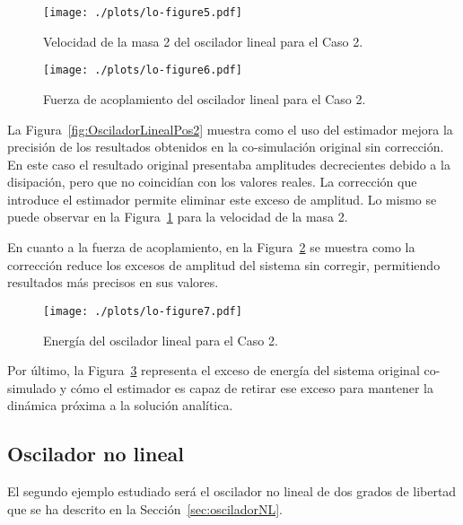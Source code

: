 \begin{figure}[ht!]\centering
	\texttt{[image: ./plots/lo-figure5.pdf]}
	\caption{Velocidad de la masa 2 del oscilador lineal para el Caso 2.}
	\label{fig:OsciladorLinealVel2}
\end{figure}

\begin{figure}[ht!]\centering
	\texttt{[image: ./plots/lo-figure6.pdf]}
	\caption{Fuerza de acoplamiento del oscilador lineal para el Caso 2.}
	\label{fig:OsciladorLinealFor2}
\end{figure}

La Figura~\ref{fig:OsciladorLinealPos2} muestra como el uso del estimador mejora la precisión de los resultados obtenidos en la co-simulación original sin corrección.
En este caso el resultado original presentaba amplitudes decrecientes debido a la disipación, pero que no coincidían con los valores reales.
La corrección que introduce el estimador permite eliminar este exceso de amplitud.
Lo mismo se puede observar en la Figura~\ref{fig:OsciladorLinealVel2} para la velocidad de la masa 2.

En cuanto a la fuerza de acoplamiento, en la Figura~\ref{fig:OsciladorLinealFor2} se muestra como la corrección reduce los excesos de amplitud del sistema sin corregir, permitiendo resultados más precisos en sus valores.

\begin{figure}[ht!]\centering
	\texttt{[image: ./plots/lo-figure7.pdf]}
	\caption{Energía del oscilador lineal para el Caso 2.}
	\label{fig:OsciladorLinealEnergia2}
\end{figure}

Por último, la Figura~\ref{fig:OsciladorLinealEnergia2} representa el exceso de energía del sistema original co-simulado y cómo el estimador es capaz de retirar ese exceso para mantener la dinámica próxima a la solución analítica.



\subsection{Oscilador no lineal}
\label{sec:res_osciladorNL}

El segundo ejemplo estudiado será el oscilador no lineal de dos grados de libertad que se ha descrito en la Sección~\ref{sec:osciladorNL}. 

